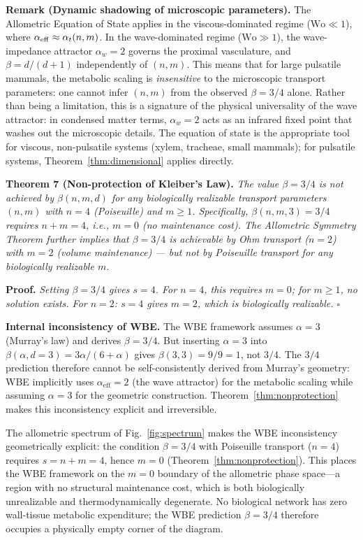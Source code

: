 \documentclass[11pt,a4paper]{article}
\theoremstyle{remark}
\newcounter{manualthm}
\begin{document}
\noindent\textbf{Remark (Dynamic shadowing of microscopic parameters).} The Allometric Equation of State applies in the viscous-dominated regime ($\mathrm{Wo} \ll 1$), where $\alpha_{\rm eff} \approx \alpha_t(n,m)$. In the wave-dominated regime ($\mathrm{Wo} \gg 1$), the wave-impedance attractor $\alpha_w = 2$ governs the proximal vasculature, and $\beta = d/(d+1)$ independently of $(n,m)$. This means that for large pulsatile mammals, the metabolic scaling is \emph{insensitive} to the microscopic transport parameters: one cannot infer $(n,m)$ from the observed $\beta = 3/4$ alone. Rather than being a limitation, this is a signature of the physical universality of the wave attractor: in condensed matter terms, $\alpha_w = 2$ acts as an infrared fixed point that washes out the microscopic details. The equation of state is the appropriate tool for viscous, non-pulsatile systems (xylem, tracheae, small mammals); for pulsatile systems, Theorem~\ref{thm:dimensional} applies directly.

\vspace{0.5em}
\noindent \textbf{Theorem 7 (Non-protection of Kleiber's Law).}\label{thm:nonprotection} \textit{The value $\beta = 3/4$ is not achieved by $\beta(n,m,d)$ for any biologically realizable transport parameters $(n,m)$ with $n=4$ (Poiseuille) and $m \geq 1$. Specifically, $\beta(n,m,3) = 3/4$ requires $n+m=4$, i.e., $m=0$ (no maintenance cost). The Allometric Symmetry Theorem further implies that $\beta=3/4$ \emph{is} achievable by Ohm transport ($n=2$) with $m=2$ (volume maintenance) --- but not by Poiseuille transport for any biologically realizable $m$.}

\noindent\textbf{Proof.} \textit{Setting $\beta = 3/4$ gives $s = 4$. For $n=4$, this requires $m=0$; for $m \geq 1$, no solution exists. For $n=2$: $s=4$ gives $m=2$, which is biologically realizable. $\square$}

\noindent\textbf{Internal inconsistency of WBE.}
The WBE framework assumes $\alpha = 3$ (Murray's law) and derives
$\beta = 3/4$. But inserting $\alpha = 3$ into
$\beta(\alpha, d=3) = 3\alpha/(6+\alpha)$ gives $\beta(3,3) = 9/9 = 1$,
not $3/4$. The $3/4$ prediction therefore cannot be self-consistently
derived from Murray's geometry: WBE implicitly uses
$\alpha_{\mathrm{eff}} = 2$ (the wave attractor) for the metabolic
scaling while assuming $\alpha = 3$ for the geometric construction.
Theorem~\ref{thm:nonprotection} makes this inconsistency explicit and irreversible.

The allometric spectrum of Fig.~\ref{fig:spectrum} makes the WBE inconsistency
geometrically explicit: the condition $\beta = 3/4$ with Poiseuille transport
($n = 4$) requires $s = n + m = 4$, hence $m = 0$ (Theorem~\ref{thm:nonprotection}). This places
the WBE framework on the $m = 0$ boundary of the allometric phase space---a
region with no structural maintenance cost, which is both biologically
unrealizable and thermodynamically degenerate. No biological network has
zero wall-tissue metabolic expenditure; the WBE prediction $\beta = 3/4$
therefore occupies a physically empty corner of the diagram.
\end{document}
